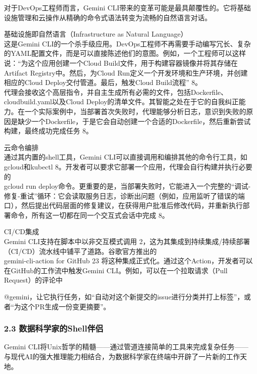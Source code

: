 \documentclass[a4paper,12pt]{article}
\begin{document}
\begin{multicols}{2}
    对于DevOps工程师而言，Gemini
    CLI带来的变革可能是最具颠覆性的。它将基础设施管理和云操作从精确的命令式语法转变为流畅的自然语言对话。

    基础设施即自然语言（Infrastructure as Natural Language）\\
    这是Gemini
    CLI的一个杀手级应用。DevOps工程师不再需要手动编写冗长、复杂的YAML配置文件，而是可以直接陈述他们的意图。例如，一个工程师可以这样说：``为这个应用创建一个Cloud
    Build文件，用于构建容器镜像并将其存储在Artifact
    Registry中。然后，为Cloud
    Run定义一个开发环境和生产环境，并创建相应的Cloud
    Deploy交付管道。最后，触发Cloud Build流程'' 8。\\
    代理会接收这个高层指令，并自主生成所有必需的文件，包括Dockerfile、cloudbuild.yaml以及Cloud
    Deploy的清单文件。其智能之处在于它的自我纠正能力。在一个实际案例中，当部署首次失败时，代理能够分析日志，意识到失败的原因是缺少一个Dockerfile，于是它会自动创建一个合适的Dockerfile，然后重新尝试构建，最终成功完成任务
    8。

    云命令编排\\
    通过其内置的shell工具，Gemini
    CLI可以直接调用和编排其他的命令行工具，如gcloud和kubectl
    8。开发者可以要求它部署一个应用，代理会自行构建并执行必要的\\
    gcloud run
    deploy命令。更重要的是，当部署失败时，它能进入一个完整的``调试-修复-重试''循环：它会读取服务日志，诊断出问题（例如，应用监听了错误的端口），然后提出代码层面的修复建议，在获得用户批准后修改代码，并重新执行部署命令，所有这一切都在同一个交互式会话中完成
    8。

    CI/CD集成\\
    Gemini CLI支持在脚本中以非交互模式调用
    2，这为其集成到持续集成/持续部署（CI/CD）流水线中铺平了道路。谷歌官方推出的\\
    gemini-cli-action for GitHub 23
    将这种集成正式化。通过这个Action，开发者可以在GitHub的工作流中触发Gemini
    CLI。例如，可以在一个拉取请求（Pull Request）的评论中

    @gemini，让它执行任务，如``自动对这个新提交的issue进行分类并打上标签''，或者``为这个PR生成一份变更摘要''。

    \subsubsection{\texorpdfstring{\textbf{2.3
    数据科学家的Shell伴侣}}{2.3 数据科学家的Shell伴侣}}\label{ux6570ux636eux79d1ux5b66ux5bb6ux7684shellux4f34ux4fa3}

    Gemini
    CLI将Unix哲学的精髓------通过管道连接简单的工具来完成复杂任务------与现代AI的强大推理能力相结合，为数据科学家在终端中开辟了一片新的工作天地。


\end{multicols}
\end{document}
